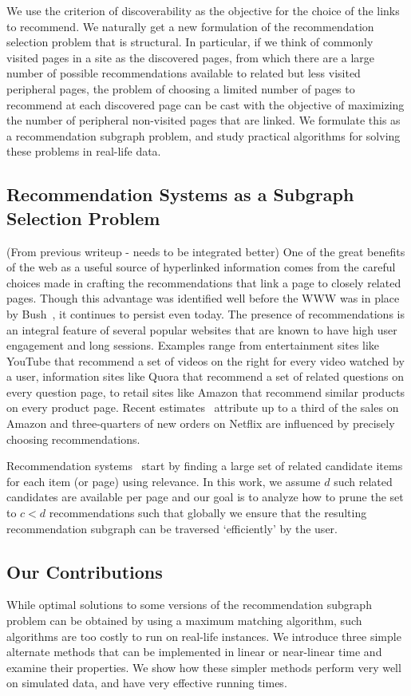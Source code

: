 We use the criterion of discoverability as the objective for the choice of the links to recommend. We naturally get a new formulation of the recommendation selection problem that is structural. In particular, if we think of commonly visited pages in a site as the discovered pages, from which there are a large number of possible recommendations available to related but less visited peripheral pages, the problem of choosing a limited number of pages to recommend at each discovered page can be cast with the objective of maximizing the number of peripheral non-visited pages that are linked. We formulate this as a recommendation subgraph problem, and study practical algorithms for solving these problems in real-life data. 

\subsection{Recommendation Systems as a Subgraph Selection Problem}

(From previous writeup - needs to be integrated better)
One of the great benefits of the web as a useful source of hyperlinked
information comes from the careful choices made in crafting the
recommendations that link a page to closely related pages. Though this
advantage was identified well before the WWW was in place by
Bush~\cite{Bush45aswe}, it continues to persist even today. The
presence of recommendations is an integral feature of several popular
websites that are known to have high user engagement and long
sessions. Examples range from entertainment sites like YouTube that
recommend a set of videos on the right for every video watched by a
user, information sites like Quora that recommend a set of related
questions on every question page, to retail sites like Amazon that
recommend similar products on every product page. Recent
estimates~\cite{big-data-book13} attribute up to a third of the sales
on Amazon and three-quarters of new orders on Netflix are influenced by precisely choosing recommendations.

Recommendation systems~\cite{Schafer1999, Adomavicius2005,
  Resnick1997} start by finding a large set of related candidate items
for each item (or page) using relevance. In this work, we assume $d$
such related candidates are available per page and our goal is to
analyze how to prune the set to $c < d$ recommendations such that
globally we ensure that the resulting recommendation subgraph can be traversed
`efficiently' by the user.

\subsection{Our Contributions}
While optimal solutions to some versions of the recommendation subgraph problem can be obtained by using a maximum matching algorithm, such algorithms are too costly to run on real-life instances. We introduce three simple alternate methods that can be implemented in linear or near-linear time and examine their properties. We show how these simpler methods perform very well on simulated data, and have very effective running times.

